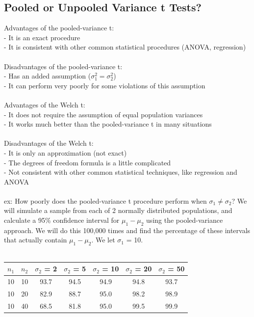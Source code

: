 \documentclass[12pt, a4paper]{article}
\begin{document}
	\subsection{Pooled or Unpooled Variance t Tests?}
	Advantages of the pooled-variance t: \\
	- It is an exact procedure \\
	- It is consistent with other common statistical procedures (ANOVA, regression) \\~\\
	Disadvantages of the pooled-variance t: \\
	- Has an added assumption ($\sigma_1^2 = \sigma_2^2$) \\
	- It can perform very poorly for some violations of this assumption \\~\\
	Advantages of the Welch t: \\
	- It does not require the assumption of equal population variances \\
	- It works much better than the pooled-variance t in many situations \\~\\
	Disadvantages of the Welch t: \\
	- It is only an approximation (not exact) \\
	- The degrees of freedom formula is a little complicated \\
	- Not consistent with other common statistical techniques, like regression and ANOVA \\~\\
	ex: How poorly does the pooled-variance t procedure perform when $\sigma_1 \neq \sigma_2$? We will simulate a sample from each of 2 normally distributed populations, and calculate a 95\% confidence interval for $\mu_1 - \mu_2$ using the pooled-variance approach. We will do this 100,000 times and find the percentage of these intervals that actually contain $\mu_1 - \mu_2$. We let $\sigma_1$ = 10. \\~\\
	\begin{tabular}{ |c|c|c|c|c|c|c| }
		\hline
		$n_1$ & $n_2$ & $\sigma_2$ = 2 & $\sigma_2$ = 5 & $\sigma_2$ = 10 & $\sigma_2$ = 20 & $\sigma_2$ = 50 \\ \hline
		10 & 10 & 93.7 & 94.5 & 94.9 & 94.8 & 93.7\\
		10 & 20 & 82.9 & 88.7 & 95.0 & 98.2 & 98.9\\
		10 & 40 & 68.5 & 81.8 & 95.0 & 99.5 & 99.9\\
		\hline
	\end{tabular} \\~\\
\end{document}
